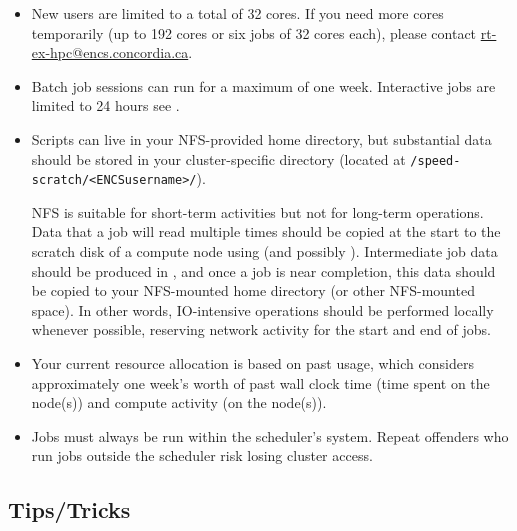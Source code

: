 \documentclass{easychair}
\begin{document}
\begin{itemize}
	\item New users are limited to a total of 32 cores. If you need more cores temporarily 
	(up to 192 cores or six jobs of 32 cores each), please contact \url{rt-ex-hpc@encs.concordia.ca}.

	\item Batch job sessions can run for a maximum of one week. 
	Interactive jobs are limited to 24 hours see .

	\item Scripts can live in your NFS-provided home directory, but substantial data 
	should be stored in your cluster-specific directory (located at \verb+/speed-scratch/<ENCSusername>/+).

	NFS is suitable for short-term activities but not for long-term operations.
	Data that a job will read multiple times should be copied at the start to the scratch disk of a compute node using
	 (and possibly ). 
	Intermediate job data should be produced in , and once a job is near completion,
	this data should be copied to your NFS-mounted home directory (or other NFS-mounted space).
	In other words, IO-intensive operations should be performed locally whenever possible, 
	reserving network activity for the start and end of jobs.

	\item Your current resource allocation is based on past usage, 
	which considers approximately one week's worth of past wall clock time 
	(time spent on the node(s)) and compute activity (on the node(s)).

	\item Jobs must always be run within the scheduler's system. Repeat offenders who 
	run jobs outside the scheduler risk losing cluster access.
\end{itemize}

% 
\subsection{Tips/Tricks}
\label{sect:tips}
\end{document}
